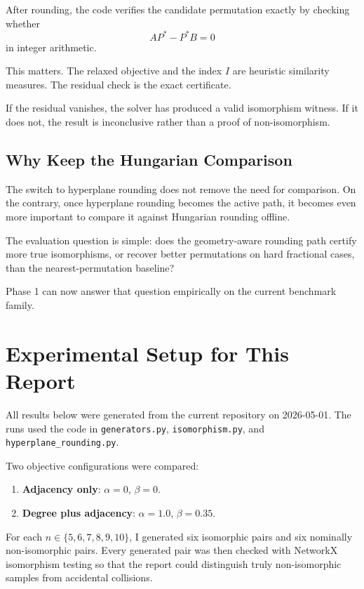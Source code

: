 \documentclass[11pt]{article}
\begin{document}
After rounding, the code verifies the candidate permutation exactly by checking whether
\begin{equation}
AP^* - P^*B = 0
\end{equation}
in integer arithmetic.

This matters.
The relaxed objective and the index $I$ are heuristic similarity measures.
The residual check is the exact certificate.

If the residual vanishes, the solver has produced a valid isomorphism witness.
If it does not, the result is inconclusive rather than a proof of non-isomorphism.

\subsection{Why Keep the Hungarian Comparison}

The switch to hyperplane rounding does not remove the need for comparison.
On the contrary, once hyperplane rounding becomes the active path, it becomes even more important to compare it against Hungarian rounding offline.

The evaluation question is simple:
does the geometry-aware rounding path certify more true isomorphisms, or recover better permutations on hard fractional cases, than the nearest-permutation baseline?

Phase 1 can now answer that question empirically on the current benchmark family.

\section{Experimental Setup for This Report}

All results below were generated from the current repository on 2026-05-01.
The runs used the code in \texttt{generators.py}, \texttt{isomorphism.py}, and \texttt{hyperplane\_rounding.py}.

Two objective configurations were compared:
\begin{enumerate}[label=\arabic*.]
    \item \textbf{Adjacency only}: $\alpha = 0$, $\beta = 0$.
    \item \textbf{Degree plus adjacency}: $\alpha = 1.0$, $\beta = 0.35$.
\end{enumerate}

For each $n \in \{5,6,7,8,9,10\}$,
I generated six isomorphic pairs and six nominally non-isomorphic pairs.
Every generated pair was then checked with NetworkX isomorphism testing so that the report could distinguish truly non-isomorphic samples from accidental collisions.
\end{document}

